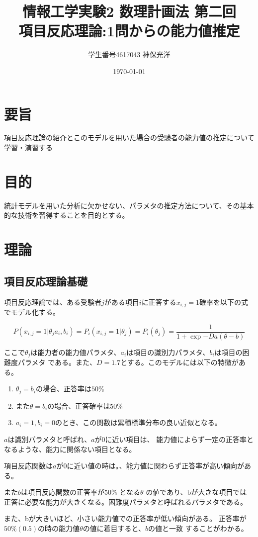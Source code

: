 \documentclass{jsarticle}
\title{情報工学実験2 数理計画法 第二回\\
        項目反応理論:1問からの能力値推定}
\author{学生番号4617043 神保光洋}
\date{\today}
\begin{document}
\maketitle

\section{要旨}
  項目反応理論の紹介とこのモデルを用いた場合の受験者の能力値の推定について学習・演習する
\section{目的}
  統計モデルを用いた分析に欠かせない、パラメタの推定方法について、その基本的な技術を習得することを目的とする。
\section{理論}
\subsection{項目反応理論基礎}
項目反応理論では、ある受験者$j$がある項目$i$に正答する$x_{i, j} = 1$確率を以下の式でモデル化する。

$$
  P(x_{i, j} = 1 | {\theta}_{j} a_i, b_i) = P_i(x_{i, j} = 1 | {\theta}_j) = 
  P_i({\theta}_j) = \frac{1}{1 + \exp{-Da(\theta - b)}}
$$

ここで${\theta}_j$は能力者の能力値パラメタ、$a_i$は項目の識別力パラメタ、$b_i$は項目の困難度パラメタ
である。また、$D=1.7$とする。このモデルには以下の特徴がある。

\begin{enumerate}
  \item ${\theta}_j = b_i$の場合、正答率は$50\%$
  \item また${\theta}= b_i$の場合、正答確率は$50\%$
  \item $a_i = 1, b_i = 0$のとき、この関数は累積標準分布の良い近似となる。
\end{enumerate}


$a$は識別パラメタと呼ばれ、$a$が$0$に近い項目は、
能力値によらず一定の正答率となるような、能力に関係ない項目となる。

項目反応関数は$a$が0に近い値の時は。、能力値に関わらず正答率が高い傾向がある。

また$b$は項目反応関数の正答率が$50\%$ となる$\theta$ の値であり、bが大きな項目では
正答に必要な能力が大きくなる。困難度パラメタと呼ばれるパラメタである。

また、bが大きいほど、小さい能力値での正答率が低い傾向がある。
正答率が$50\%(0.5)$の時の能力値$\theta$の値に着目すると、$b$の値と一致
することがわかる。
\end{document}
